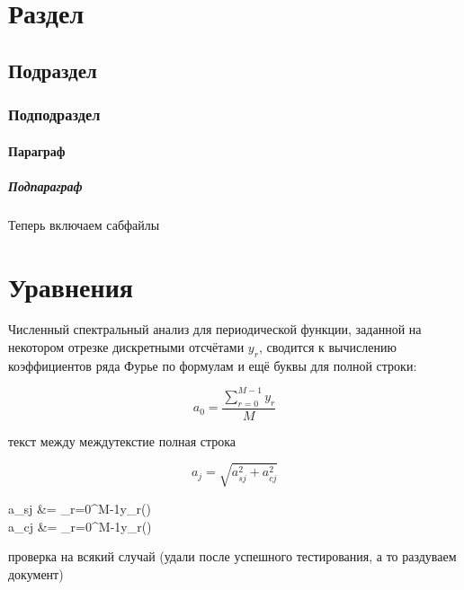 \documentclass[a4paper]{article}
\begin{document}
	\tableofcontents
	\section{Раздел}
	\blindtext
	\subsection{Подраздел}
	\blindtext
	\subsubsection{Подподраздел}
	\blindtext
	\paragraph{Параграф}
	\blindtext
	\subparagraph{Подпараграф}
	\blindtext
	
	\newpage
	
	\vfill
	
	Теперь включаем сабфайлы
	
	\vfill
	
	\newpage
	
	

	
	\tableofcontents
	
	\section{Уравнения}
	Численный спектральный анализ для периодической функции, заданной на некотором отрезке дискретными отсчётами $y_r$, сводится к вычислению коэффициентов ряда Фурье по формулам и ещё буквы для полной строки:
	
	\begin{equation}\label{eq:a0}
		a_0=\frac{\sum\limits_{r=0}^{M-1}y_r}{M}
	\end{equation}
	
	текст между междутекстие полная строка
	
	\begin{equation}
		a_j=\sqrt{a_{sj}^2+a_{cj}^2}
	\end{equation}
	
\blindtext
	
	\begin{aleq}\label{eq:ascj}
		a_{sj} &= \sum\limits_{r=0}^{M-1}y_r\sin\left(\right)\\
		a_{cj} &= \sum\limits_{r=0}^{M-1}y_r\cos\left(\right)
	\end{aleq}
проверка на всякий случай (удали после успешного тестирования, а то раздуваем документ)
	\nocite{*}
\end{document}
